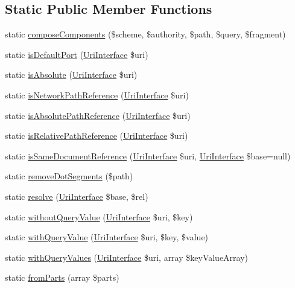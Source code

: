 \subsection*{Static Public Member Functions}
\begin{DoxyCompactItemize}
\item 
static \hyperlink{classGuzzleHttp_1_1Psr7_1_1Uri_a55774932d840a511df95f7e7ca8e8598}{compose\+Components} (\$scheme, \$authority, \$path, \$query, \$fragment)
\item 
static \hyperlink{classGuzzleHttp_1_1Psr7_1_1Uri_aabb058d1d5d95b7102bc36016bc9afdb}{is\+Default\+Port} (\hyperlink{interfacePsr_1_1Http_1_1Message_1_1UriInterface}{Uri\+Interface} \$uri)
\item 
static \hyperlink{classGuzzleHttp_1_1Psr7_1_1Uri_ae863982e053522ed756733d2354eb575}{is\+Absolute} (\hyperlink{interfacePsr_1_1Http_1_1Message_1_1UriInterface}{Uri\+Interface} \$uri)
\item 
static \hyperlink{classGuzzleHttp_1_1Psr7_1_1Uri_ad1c4e868c38ac77b124c979cca3ae4e0}{is\+Network\+Path\+Reference} (\hyperlink{interfacePsr_1_1Http_1_1Message_1_1UriInterface}{Uri\+Interface} \$uri)
\item 
static \hyperlink{classGuzzleHttp_1_1Psr7_1_1Uri_a1a4f72405456c0c0871aa9a3995f577c}{is\+Absolute\+Path\+Reference} (\hyperlink{interfacePsr_1_1Http_1_1Message_1_1UriInterface}{Uri\+Interface} \$uri)
\item 
static \hyperlink{classGuzzleHttp_1_1Psr7_1_1Uri_a0a323a09016078d6174b90a5664578a6}{is\+Relative\+Path\+Reference} (\hyperlink{interfacePsr_1_1Http_1_1Message_1_1UriInterface}{Uri\+Interface} \$uri)
\item 
static \hyperlink{classGuzzleHttp_1_1Psr7_1_1Uri_a902dc2b5cca5ba1feca4555aff79845d}{is\+Same\+Document\+Reference} (\hyperlink{interfacePsr_1_1Http_1_1Message_1_1UriInterface}{Uri\+Interface} \$uri, \hyperlink{interfacePsr_1_1Http_1_1Message_1_1UriInterface}{Uri\+Interface} \$base=null)
\item 
static \hyperlink{classGuzzleHttp_1_1Psr7_1_1Uri_ae7b3647eee5795214441da3249106daa}{remove\+Dot\+Segments} (\$path)
\item 
static \hyperlink{classGuzzleHttp_1_1Psr7_1_1Uri_a2830373f1802a9f4381be81a3f008c5b}{resolve} (\hyperlink{interfacePsr_1_1Http_1_1Message_1_1UriInterface}{Uri\+Interface} \$base, \$rel)
\item 
static \hyperlink{classGuzzleHttp_1_1Psr7_1_1Uri_a4f2617053a75ae57bc94ac4afb4af3b2}{without\+Query\+Value} (\hyperlink{interfacePsr_1_1Http_1_1Message_1_1UriInterface}{Uri\+Interface} \$uri, \$key)
\item 
static \hyperlink{classGuzzleHttp_1_1Psr7_1_1Uri_a6c78bb020386bd502b492ca7b786d447}{with\+Query\+Value} (\hyperlink{interfacePsr_1_1Http_1_1Message_1_1UriInterface}{Uri\+Interface} \$uri, \$key, \$value)
\item 
static \hyperlink{classGuzzleHttp_1_1Psr7_1_1Uri_a4964d3e671a4a0df09d53240cf235938}{with\+Query\+Values} (\hyperlink{interfacePsr_1_1Http_1_1Message_1_1UriInterface}{Uri\+Interface} \$uri, array \$key\+Value\+Array)
\item 
static \hyperlink{classGuzzleHttp_1_1Psr7_1_1Uri_a54fafc270af7022abef9fbe624032311}{from\+Parts} (array \$parts)
\end{DoxyCompactItemize}
